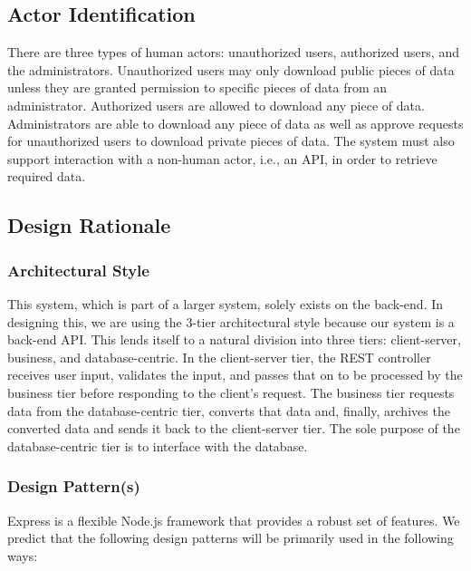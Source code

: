 \documentclass{article}
\begin{document}
\clearpage

\subsection{Actor Identification}

There are three types of human actors: unauthorized users, authorized users, and the administrators. Unauthorized users may only download public pieces of data unless they are granted permission to specific pieces of data from an administrator. Authorized users are allowed to download any piece of data. Administrators are able to download any piece of data as well as approve requests for unauthorized users to download private pieces of data. The system must also support interaction with a non-human actor, i.e., an API, in order to retrieve
required data. 

\subsection{Design Rationale}

\subsubsection{Architectural Style}

This system, which is part of a larger system, solely exists on the back-end. In designing this, we are using the 3-tier architectural style because our system is a back-end API. This lends itself to a natural division into three tiers: client-server, business, and database-centric. In the client-server tier, the REST controller receives user input, validates the input, and passes that on to be processed by the business tier before responding to the client's request. The business tier requests data from the database-centric tier, converts that data and, finally, archives the converted data and sends it back to the client-server tier. The sole purpose of the database-centric tier is to interface with the database. 

\subsubsection{Design Pattern(s)}

Express is a flexible Node.js framework that provides a robust set of features. We predict that the following design patterns will be primarily used in the following ways: \\
\end{document}
